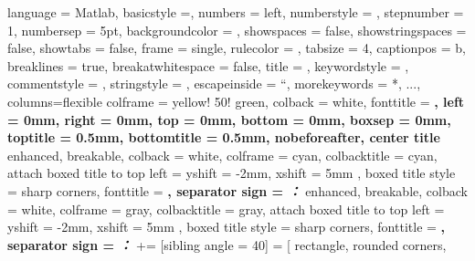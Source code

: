 {	language = Matlab, 			%
	basicstyle =\tiny\monaco, 		%
	numbers = left, 				%
	numberstyle = \tiny\color{gray}\monaco, 	%
	stepnumber = 1, 			%
	numbersep = 5pt, 			%
	backgroundcolor = \color{white}, %
	showspaces = false, 			%
	showstringspaces = false, 		%
	showtabs = false, 			%
	frame = single, 				%
	rulecolor = \color{black}, 		%
	tabsize = 4, 				%
	captionpos = b, 				%
	breaklines = true, 			%
	breakatwhitespace = false, 	%
	title = \lstname, 				%
	keywordstyle = \color{blue}, 	%
	commentstyle = \color{dkgreen}, %
	stringstyle = \color{mauve}, 	%
	escapeinside = ``, 			%
	morekeywords = {*, ...},		%
	columns=flexible
}
\tcbset
{	colframe = yellow! 50! green, 
	colback = white, 
	fonttitle = \bfseries, 
	left = 0mm, 
	right = 0mm, 
	top = 0mm, 
	bottom = 0mm, 
	boxsep = 0mm, 
 	toptitle = 0.5mm, 
 	bottomtitle = 0.5mm, 
	nobeforeafter, center title
}
{	enhanced, breakable, 
	colback = white, 
	colframe = cyan, 
	colbacktitle = cyan, 
	attach boxed title to top left = 
	{	yshift = -2mm, 
		xshift = 5mm
	}, 
	boxed title style = {sharp corners}, 
	fonttitle = \sffamily\bfseries, 
	separator sign = {\it ：}
}{}
{	enhanced, breakable, 
	colback = white, 
	colframe = gray, 
	colbacktitle = gray, 
	attach boxed title to top left = 
	{	yshift = -2mm, 
		xshift = 5mm
	}, 
	boxed title style = {sharp corners}, 
	fonttitle = \sffamily\bfseries, 
	separator sign = {\it ：}
}{}
 += [sibling angle = 40]
 = 
[	rectangle, rounded corners, 
